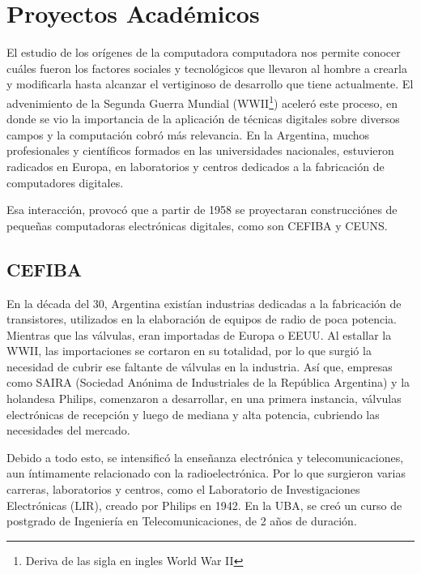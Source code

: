 \documentclass[%
 	final,
%
	notitlepage,
	narroweqnarray,
	inline,
 	twoside,
	]{ieee}
\begin{document}
\section{Proyectos Acad\'emicos}
El estudio de los or\'igenes de la computadora computadora nos permite conocer cu\'ales fueron los factores sociales y tecnol\'ogicos que llevaron al hombre a crearla y modificarla hasta alcanzar el vertiginoso de desarrollo que tiene actualmente. El advenimiento de la Segunda Guerra Mundial (WWII\footnote{Deriva de las sigla en ingles World War II}) aceler\'o este proceso, en donde se vio la importancia de la aplicaci\'on de t\'ecnicas digitales sobre diversos campos y la computaci\'on cobr\'o m\'as relevancia. En la Argentina, muchos profesionales y cient\'ificos formados en las universidades nacionales, estuvieron radicados en Europa, en laboratorios y centros dedicados a la fabricaci\'on de computadores digitales. 

Esa interacci\'on, provoc\'o que a partir de 1958 se proyectaran construcci\'ones de peque\~nas computadoras electr\'onicas digitales, como son CEFIBA y CEUNS.

\subsection*{CEFIBA}

En la d\'ecada del 30, Argentina exist\'ian industrias dedicadas a la fabricaci\'on de transistores, utilizados en la elaboraci\'on de equipos de radio de poca potencia. Mientras que las v\'alvulas, eran importadas de Europa o EEUU. Al estallar la WWII, las importaciones se cortaron en su totalidad, por lo que surgi\'o la necesidad de cubrir ese faltante de v\'alvulas en la industria. As\'i que, empresas como SAIRA (Sociedad An\'onima de Industriales de la Rep\'ublica Argentina) y la holandesa Philips, comenzaron a desarrollar, en una primera instancia, v\'alvulas electr\'onicas de recepci\'on y luego de mediana y alta potencia, cubriendo las necesidades del mercado.

Debido a todo esto, se intensific\'o la ense\~nanza electr\'onica y telecomunicaciones, aun \'intimamente relacionado con la radioelectr\'onica. Por lo que surgieron varias carreras, laboratorios y centros, como el Laboratorio de Investigaciones Electr\'onicas (LIR), creado por Philips en 1942. En la UBA, se cre\'o un curso de postgrado de Ingenier\'ia en Telecomunicaciones, de 2 a\~nos de duraci\'on.
\end{document}
